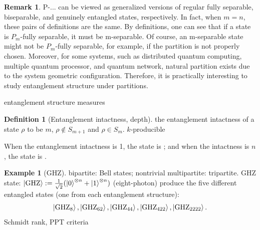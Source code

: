 \documentclass[
10pt,
aps,
pra,
linenumbers,
floatfix,
]{revtex4-2}
\theoremstyle{plain}
\theoremstyle{definition}
\newtheorem{definition}{Definition}
\newtheorem{example}{Example}
\newtheorem{remark}{Remark}
\newcommand{\ghz}{\text{GHZ}}
\newcommand{\dm}{\rho}
\begin{document}
\begin{remark}
	P-... can be viewed as generalized versions of regular fully separable, biseparable, and genuinely entangled states, respectively.
	In fact, when $m=n$, these pairs of definitions are the same.
	By definitions, one can see that if a state is $P_m$-fully separable, it must be m-separable. Of course, an m-separable state might not be $P_m$-fully separable, for example, if the partition is not properly chosen.
	Moreover, for some systems, such as distributed quantum computing, multiple quantum processor, and quantum network, natural partition exists due to the system geometric conﬁguration. Therefore, it is practically interesting to study entanglement structure under partitions.
\end{remark}
entanglement structure measures
\begin{definition}[Entanglement intactness, depth]
	the entanglement intactness of a state $\dm$ to be $m$, \iff $\dm\notin S_{m+1}$ and $\dm\in S_m$.
	$k$-producible
\end{definition}

	When the entanglement intactness is 1, the state is ; and when the intactness is $n$, the state is .
\begin{example}[GHZ]\label{exm:ghz}
	bipartite: Bell states;
	nontrivial multipartite: tripartite.
	GHZ state: $\ket{\ghz}:=\frac{1}{\sqrt{2}}(\ket{0}^{\otimes n} + \ket{1}^{\otimes n} )$ (eight-photon) produce the five different entangled states (one from each entanglement structure): 
	\begin{equation*}
		\ket{\ghz_8},\ket{\ghz_{62}},\ket{\ghz_{44}},\ket{\ghz_{422}},\ket{\ghz_{2222}}.
	\end{equation*}
	Schmidt rank, PPT criteria
\end{example}
\end{document}

